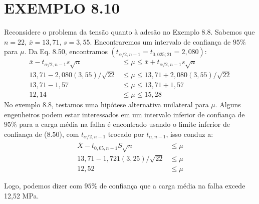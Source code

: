 \documentclass[a4paper,12pt]{article} %
\begin{document}
	\section*{EXEMPLO 8.10}
	Reconsidere o problema da tensão quanto à adesão no Exemplo 8.8. Sabemos que $n = 22$, $\overline{x} = 13,71$, $s=3,55$. Encontraremos um intervalo de confiança de $ 95\% $ para $\mu$. Da Eq. 8.50, encontramos $ \left(t_{\alpha / 2, n-1} = t_{0,025; 21} = 2,080 \right)  $:
	\begin{align*} 
		\overline{x} - t_{\alpha / 2, n-1} s \sqrt{n}  & \leq \mu \leq  \overline{x} + t_{\alpha / 2, n-1} s \sqrt{n}  \\ 
		13,71 - 2,080 \left( 3,55 \right) / \sqrt{22}  & \leq \mu \leq  13,71 + 2,080 \left( 3,55 \right) / \sqrt{22}  \\
		13,71 - 1,57  & \leq \mu \leq  13,71 + 1,57 \\
		12,14  & \leq \mu \leq  15,28
	\end{align*}
	No exemplo 8.8, testamos uma hipótese alternativa unilateral para $ \mu $. Alguns engenheiros podem estar interessados em um intervalo inferior de confiança de $95\%$ para a carga média na falha é encontrado usando o limite inferior de confiança de (8.50), com $t_{\alpha / 2, n-1}$ trocado por $t_{\alpha, n-1}$, isso conduz a:
	\begin{align*} 
		\overline{X} - t_{0,05, n-1} S \sqrt{n}  & \leq \mu  \\ 
		13,71 - 1,721 \left( 3,25 \right) / \sqrt{22}  & \leq \mu  \\ 
		12,52 & \leq \mu
	\end{align*}

	Logo, podemos dizer com $95\%$ de confiança que a carga média na falha excede 12,52 MPa.
	
	

	
	
	
\end{document}
